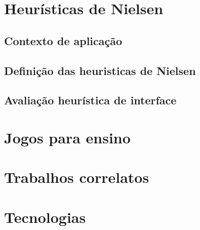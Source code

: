 \section{Heurísticas de Nielsen}



\subsection{Contexto de aplicação}



\subsection{Definição das heuristicas de Nielsen}



\subsection{Avaliação heurística de interface}



\section{Jogos para ensino}



\section{Trabalhos correlatos}



\section{Tecnologias}

